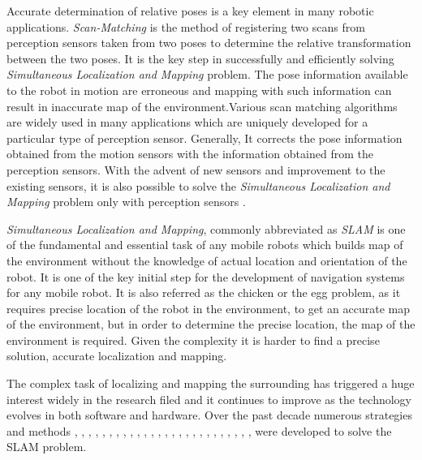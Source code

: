 Accurate determination of relative poses is a key element in many robotic applications. \textit{Scan-Matching} is the method of registering two scans from perception sensors taken from two poses to determine the relative transformation between the two poses. It is the key step in successfully and efficiently solving \textit{Simultaneous Localization and Mapping} problem. The pose information available to the robot in motion are erroneous and mapping with such information can result in inaccurate map of the environment.Various scan matching algorithms are widely used in many applications which are uniquely developed for a particular type of perception sensor. Generally, It corrects the pose information obtained from the motion sensors with the information obtained from the perception sensors\cite{GMap_algo}. With the advent of new sensors and improvement to the existing sensors, it is also possible to solve the \textit{Simultaneous Localization and Mapping} problem only with perception sensors \cite{loam}.

\textit{Simultaneous Localization and Mapping}, commonly abbreviated as \textit{SLAM} is one of the fundamental and essential task of any mobile robots which builds map of the environment without the knowledge of actual location and orientation of the robot. It is one of the key initial step for the development of navigation systems for any mobile robot. It is also referred as  the chicken or the egg problem, as it requires precise location of the robot in the environment, to get an accurate map of the environment, but in order to determine the precise location, the map of the environment is required. Given the complexity it is  harder to find a precise solution, accurate localization and mapping.

The complex task of localizing and mapping the surrounding has triggered a huge interest widely in the research filed and it continues to  improve as the technology evolves in both software and hardware. Over the past decade numerous strategies and methods \cite{A.Pratik}, \cite{E.Olson_Map}, \cite{T.seb_survey}, \cite{D.Hahnel}, \cite{M.Montemerlo}, \cite{W.Burgard}, \cite{GMap_algo}, \cite{G.Grisetti}, \cite{J.Kang}, \cite{K.Konolige}, \cite{W.Burgard}, \cite{T.Reineking}, \cite{D.Droeschel}, \cite{SUMA++}, \cite{VPS_SLAM}, \cite{RT_Graph}, \cite{chen2020rss}, \cite{loam}, \cite{ChanWF}, \cite{TatenoTLN17}, \cite{K.Ryu}, \cite{faucris.119665744}, \cite{Lu-2016-5572}, \cite{Mur_Artal_2015}, \cite{Mur_Artal_2017}, \cite{P.Agarwal}, \cite{segmap2018} were developed to solve the SLAM problem. 

